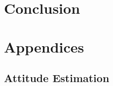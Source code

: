 \documentclass[a4paper, 12pt]{report}
\begin{document}
\newpage
\section{Conclusion}

\newpage



\newpage
\appendix
\section*{Appendices}
\renewcommand{\thesubsection}{\Alph{subsection}}

\subsection{Attitude Estimation}
\label{app:att_estim}
\end{document}
